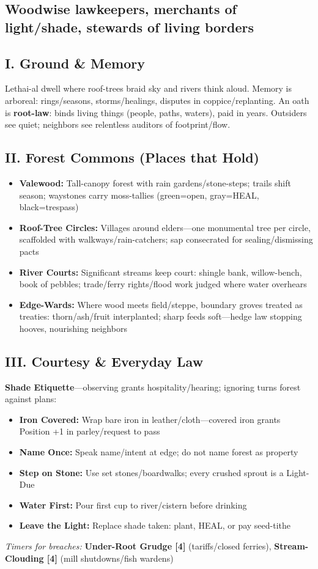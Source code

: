 \documentclass[11pt]{book}
\begin{document}
\subsection*{Woodwise lawkeepers, merchants of light/shade, stewards of living borders}

\subsection{I. Ground \& Memory}
Lethai-al dwell where roof-trees braid sky and rivers think aloud. Memory is arboreal: rings/seasons, storms/healings, disputes in coppice/replanting. An oath is \textbf{root-law}: binds living things (people, paths, waters), paid in years. Outsiders see quiet; neighbors see relentless auditors of footprint/flow.

\subsection{II. Forest Commons (Places that Hold)}
\begin{itemize}
    \item \textbf{Valewood:} Tall-canopy forest with rain gardens/stone-steps; trails shift season; waystones carry moss-tallies (green=open, gray=HEAL, black=trespass)
    \item \textbf{Roof-Tree Circles:} Villages around elders---one monumental tree per circle, scaffolded with walkways/rain-catchers; sap consecrated for sealing/dismissing pacts
    \item \textbf{River Courts:} Significant streams keep court: shingle bank, willow-bench, book of pebbles; trade/ferry rights/flood work judged where water overhears
    \item \textbf{Edge-Wards:} Where wood meets field/steppe, boundary groves treated as treaties: thorn/ash/fruit interplanted; sharp feeds soft---hedge law stopping hooves, nourishing neighbors
\end{itemize}

\subsection{III. Courtesy \& Everyday Law}
\textbf{Shade Etiquette}---observing grants hospitality/hearing; ignoring turns forest against plans:
\begin{itemize}
    \item \textbf{Iron Covered:} Wrap bare iron in leather/cloth---covered iron grants Position +1 in parley/request to pass
    \item \textbf{Name Once:} Speak name/intent at edge; do not name forest as property
    \item \textbf{Step on Stone:} Use set stones/boardwalks; every crushed sprout is a Light-Due
    \item \textbf{Water First:} Pour first cup to river/cistern before drinking
    \item \textbf{Leave the Light:} Replace shade taken: plant, HEAL, or pay seed-tithe
\end{itemize}
\textit{Timers for breaches:} \textbf{Under-Root Grudge [4]} (tariffs/closed ferries), \textbf{Stream-Clouding [4]} (mill shutdowns/fish wardens)
\end{document}
